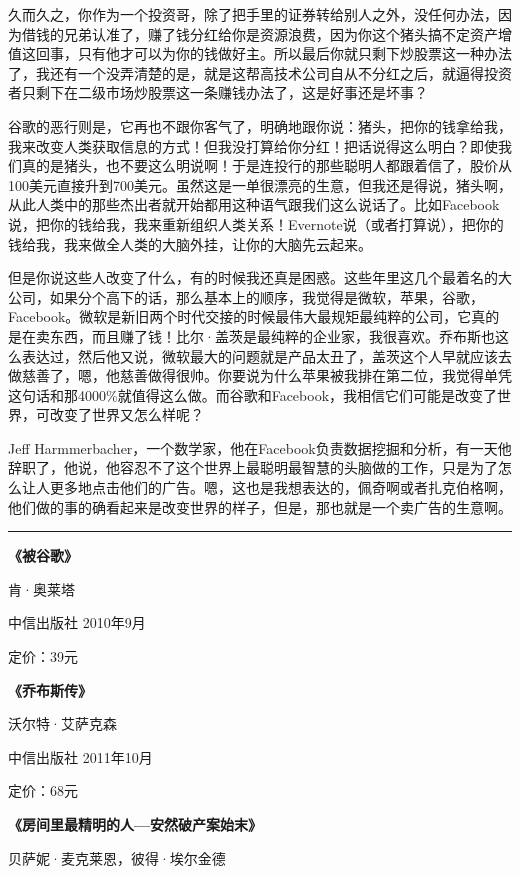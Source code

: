 久而久之，你作为一个投资哥，除了把手里的证券转给别人之外，没任何办法，因为借钱的兄弟认准了，赚了钱分红给你是资源浪费，因为你这个猪头搞不定资产增值这回事，只有他才可以为你的钱做好主。所以最后你就只剩下炒股票这一种办法了，我还有一个没弄清楚的是，就是这帮高技术公司自从不分红之后，就逼得投资者只剩下在二级市场炒股票这一条赚钱办法了，这是好事还是坏事？

谷歌的恶行则是，它再也不跟你客气了，明确地跟你说：猪头，把你的钱拿给我，我来改变人类获取信息的方式！但我没打算给你分红！把话说得这么明白？即使我们真的是猪头，也不要这么明说啊！于是连投行的那些聪明人都跟着信了，股价从100美元直接升到700美元。虽然这是一单很漂亮的生意，但我还是得说，猪头啊，从此人类中的那些杰出者就开始都用这种语气跟我们这么说话了。比如Facebook说，把你的钱给我，我来重新组织人类关系！Evernote说（或者打算说），把你的钱给我，我来做全人类的大脑外挂，让你的大脑先云起来。

但是你说这些人改变了什么，有的时候我还真是困惑。这些年里这几个最着名的大公司，如果分个高下的话，那么基本上的顺序，我觉得是微软，苹果，谷歌，Facebook。微软是新旧两个时代交接的时候最伟大最规矩最纯粹的公司，它真的是在卖东西，而且赚了钱！比尔·盖茨是最纯粹的企业家，我很喜欢。乔布斯也这么表达过，然后他又说，微软最大的问题就是产品太丑了，盖茨这个人早就应该去做慈善了，嗯，他慈善做得很帅。你要说为什么苹果被我排在第二位，我觉得单凭这句话和那4000\%就值得这么做。而谷歌和Facebook，我相信它们可能是改变了世界，可改变了世界又怎么样呢？

Jeff
Harmmerbacher，一个数学家，他在Facebook负责数据挖掘和分析，有一天他辞职了，他说，他容忍不了这个世界上最聪明最智慧的头脑做的工作，只是为了怎么让人更多地点击他们的广告。嗯，这也是我想表达的，佩奇啊或者扎克伯格啊，他们做的事的确看起来是改变世界的样子，但是，那也就是一个卖广告的生意啊。

\begin{center}\rule{0.5\linewidth}{0.5pt}\end{center}

\textbf{《被谷歌》}

肯·奥莱塔

中信出版社 2010年9月

定价：39元

\textbf{《乔布斯传》}

沃尔特·艾萨克森

中信出版社 2011年10月

定价：68元

\textbf{《房间里最精明的人---安然破产案始末》}

贝萨妮·麦克莱恩，彼得·埃尔金德

